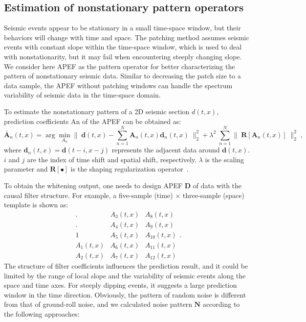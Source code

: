 \subsection{Estimation of nonstationary pattern operators}
Seismic events appear to be stationary in a small time-space window,
but their behaviors will change with time and space. The patching method
assumes seismic events with constant slope within the time-space window,
which is used to deal with nonstationarity, but it may fail when
encountering steeply changing slope. We consider here APEF as the pattern
operator for better characterizing the pattern of nonstationary seismic
data. Similar to decreasing the patch size to a data sample, the APEF
without patching windows can handle the spectrum variability of seismic
data in the time-space domain.

To estimate the nonstationary pattern of a 2D seismic section $d(t,x)$,
prediction coefficients An of the APEF can be obtained as:
\begin{equation}
    \label{eq:pred2}
    \bar{\mathbf{A}}_{n} (t,x) = \arg \min_{A_{n}} \| \; \mathbf{d}(t,x)
    - \sum_{n=1}^{N} \mathbf{A}_{n}(t,x) \mathbf{d}_{n}(t,x) \; \|_2^2
    + \lambda^{2} \; \sum_{n=1}^{N} \| \; \mathbf{R} [\mathbf{A}_{n}(t,x)] \; \|_2^2\;,
\end{equation}
where  $\mathbf{d}_{n}(t,x) = \mathbf{d}(t-i,x-j)$ represents the adjacent
data around $\mathbf{d}(t,x)$. $i$ and $j$ are the index of time shift and
spatial shift, respectively. $\lambda$ is the scaling parameter and
$\mathbf{R[\bullet]}$ is the shaping regularization operator~\cite{Fomel09}.

To obtain the whitening output, one needs to design APEF $\mathbf{D}$ of data
with the causal filter structure. For example, a five-sample (time) $\times$
three-sample (space) template is shown as:
\begin{equation}
    \begin{array}{ccc}
        .          & A_{3}(t,x) & A_{8}(t,x)  \\
        .          & A_{4}(t,x) & A_{9}(t,x)  \\
        1          & A_{5}(t,x) & A_{10}(t,x) \\
        A_{1}(t,x) & A_{6}(t,x) & A_{11}(t,x) \\
        A_{2}(t,x) & A_{7}(t,x) & A_{12}(t,x)
    \end{array} .
    \label{eq:causalpef}
\end{equation}
The structure of filter coefficients influences the prediction result, and it
could be limited by the range of local slope and the variability of seismic
events along the space and time axes. For steeply dipping events, it suggests
a large prediction window in the time direction. Obviously, the pattern of random
noise is different from that of ground-roll noise, and we calculated noise
pattern $\mathbf{N}$ according to the following approaches:

